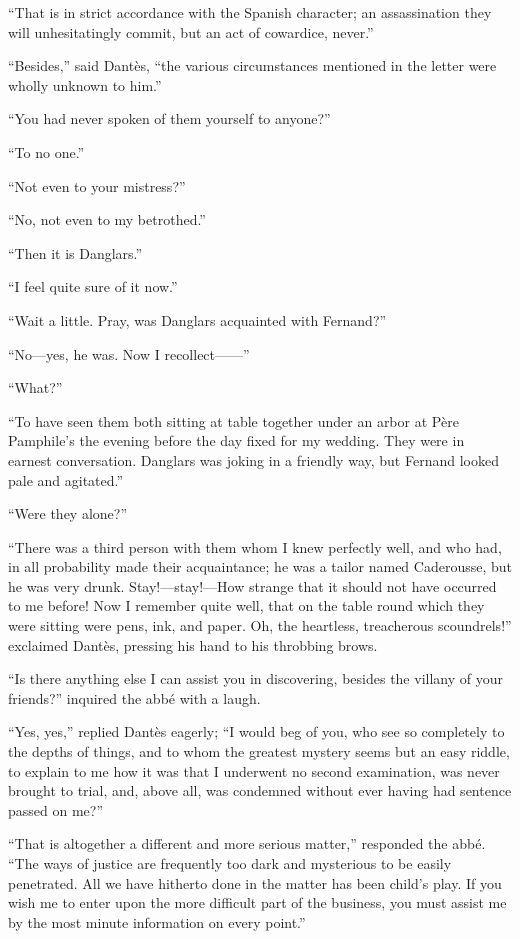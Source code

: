 “That is in strict accordance with the Spanish character; an
assassination they will unhesitatingly commit, but an act of cowardice,
never.”

“Besides,” said Dantès, “the various circumstances mentioned in the
letter were wholly unknown to him.”

“You had never spoken of them yourself to anyone?”

“To no one.”

“Not even to your mistress?”

“No, not even to my betrothed.”

“Then it is Danglars.”

“I feel quite sure of it now.”

“Wait a little. Pray, was Danglars acquainted with Fernand?”

“No—yes, he was. Now I recollect——”

“What?”

“To have seen them both sitting at table together under an arbor at
Père Pamphile’s the evening before the day fixed for my wedding. They
were in earnest conversation. Danglars was joking in a friendly way,
but Fernand looked pale and agitated.”

“Were they alone?”

“There was a third person with them whom I knew perfectly well, and who
had, in all probability made their acquaintance; he was a tailor named
Caderousse, but he was very drunk. Stay!—stay!—How strange that it
should not have occurred to me before! Now I remember quite well, that
on the table round which they were sitting were pens, ink, and paper.
Oh, the heartless, treacherous scoundrels!” exclaimed Dantès, pressing
his hand to his throbbing brows.

“Is there anything else I can assist you in discovering, besides the
villany of your friends?” inquired the abbé with a laugh.

“Yes, yes,” replied Dantès eagerly; “I would beg of you, who see so
completely to the depths of things, and to whom the greatest mystery
seems but an easy riddle, to explain to me how it was that I underwent
no second examination, was never brought to trial, and, above all, was
condemned without ever having had sentence passed on me?”

“That is altogether a different and more serious matter,” responded the
abbé. “The ways of justice are frequently too dark and mysterious to be
easily penetrated. All we have hitherto done in the matter has been
child’s play. If you wish me to enter upon the more difficult part of
the business, you must assist me by the most minute information on
every point.”

